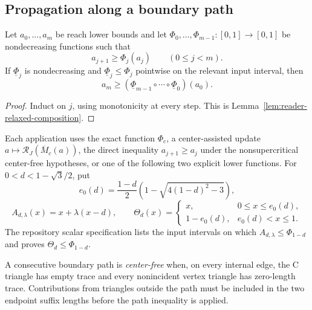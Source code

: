 \subsection{Propagation along a boundary path}

\begin{lemma}
\label{lem:body-monotone-propagation}
Let $a_0,\ldots,a_m$ be reach lower bounds and let
$\Phi_0,\ldots,\Phi_{m-1}:[0,1]\to[0,1]$ be nondecreasing functions such that
\[
 a_{j+1}\ge\Phi_j(a_j)\qquad(0\le j<m).
\]
If $\underline\Phi_j$ is nondecreasing and
$\underline\Phi_j\le\Phi_j$ pointwise on the relevant input interval, then
\[
 a_m\ge
 (\underline\Phi_{m-1}\circ\cdots\circ\underline\Phi_0)(a_0).
\]
\end{lemma}

\begin{proof}
Induct on $j$, using monotonicity at every step.  This is
Lemma~\ref{lem:reader-relaxed-composition}.
\end{proof}

Each application uses the exact function $\Phi_c$, a center-assisted update
$a\mapsto\mathcal R_J(\overline M_c(a))$, the direct
inequality $a_{j+1}\ge a_j$ under the nonsupercritical center-free
hypotheses, or one of the following two explicit lower functions.  For
$0<d<1-\sqrt3/2$, put
\[
 e_0(d)=\frac{1-d}{2}
 \left(1-\sqrt{4(1-d)^2-3}\right),
\]
\[
 A_{d,\lambda}(x)=x+\lambda(x-d),
 \qquad
 \Theta_d(x)=
 \begin{cases}
 x,&0\le x\le e_0(d),\\
 1-e_0(d),&e_0(d)<x\le1.
 \end{cases}
\]
The repository scalar specification lists the input intervals on which
$A_{d,\lambda}\le\Phi_{1-d}$ and proves
$\Theta_d\le\Phi_{1-d}$.

\begin{definition}
\label{def:body-center-free-path}
A consecutive boundary path is \emph{center-free} when, on every internal
edge, the C triangle has empty trace and every nonincident vertex
triangle has zero-length trace.  Contributions from triangles outside the
path must be included in the two endpoint suffix lengths before the path
inequality is applied.
\end{definition}


